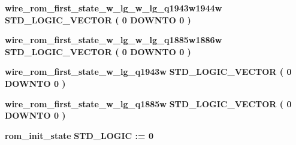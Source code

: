 \begin{DoxyCompactItemize}
\item 
{\bf wire\+\_\+rom\+\_\+first\+\_\+state\+\_\+w\+\_\+lg\+\_\+w\+\_\+lg\+\_\+q1943w1944w} {\bfseries \textcolor{comment}{S\+T\+D\+\_\+\+L\+O\+G\+I\+C\+\_\+\+V\+E\+C\+T\+OR}\textcolor{vhdlchar}{ }\textcolor{vhdlchar}{(}\textcolor{vhdlchar}{ }\textcolor{vhdlchar}{ } \textcolor{vhdldigit}{0} \textcolor{vhdlchar}{ }\textcolor{keywordflow}{D\+O\+W\+N\+TO}\textcolor{vhdlchar}{ }\textcolor{vhdlchar}{ } \textcolor{vhdldigit}{0} \textcolor{vhdlchar}{ }\textcolor{vhdlchar}{)}\textcolor{vhdlchar}{ }} 
\item 
{\bf wire\+\_\+rom\+\_\+first\+\_\+state\+\_\+w\+\_\+lg\+\_\+w\+\_\+lg\+\_\+q1885w1886w} {\bfseries \textcolor{comment}{S\+T\+D\+\_\+\+L\+O\+G\+I\+C\+\_\+\+V\+E\+C\+T\+OR}\textcolor{vhdlchar}{ }\textcolor{vhdlchar}{(}\textcolor{vhdlchar}{ }\textcolor{vhdlchar}{ } \textcolor{vhdldigit}{0} \textcolor{vhdlchar}{ }\textcolor{keywordflow}{D\+O\+W\+N\+TO}\textcolor{vhdlchar}{ }\textcolor{vhdlchar}{ } \textcolor{vhdldigit}{0} \textcolor{vhdlchar}{ }\textcolor{vhdlchar}{)}\textcolor{vhdlchar}{ }} 
\item 
{\bf wire\+\_\+rom\+\_\+first\+\_\+state\+\_\+w\+\_\+lg\+\_\+q1943w} {\bfseries \textcolor{comment}{S\+T\+D\+\_\+\+L\+O\+G\+I\+C\+\_\+\+V\+E\+C\+T\+OR}\textcolor{vhdlchar}{ }\textcolor{vhdlchar}{(}\textcolor{vhdlchar}{ }\textcolor{vhdlchar}{ } \textcolor{vhdldigit}{0} \textcolor{vhdlchar}{ }\textcolor{keywordflow}{D\+O\+W\+N\+TO}\textcolor{vhdlchar}{ }\textcolor{vhdlchar}{ } \textcolor{vhdldigit}{0} \textcolor{vhdlchar}{ }\textcolor{vhdlchar}{)}\textcolor{vhdlchar}{ }} 
\item 
{\bf wire\+\_\+rom\+\_\+first\+\_\+state\+\_\+w\+\_\+lg\+\_\+q1885w} {\bfseries \textcolor{comment}{S\+T\+D\+\_\+\+L\+O\+G\+I\+C\+\_\+\+V\+E\+C\+T\+OR}\textcolor{vhdlchar}{ }\textcolor{vhdlchar}{(}\textcolor{vhdlchar}{ }\textcolor{vhdlchar}{ } \textcolor{vhdldigit}{0} \textcolor{vhdlchar}{ }\textcolor{keywordflow}{D\+O\+W\+N\+TO}\textcolor{vhdlchar}{ }\textcolor{vhdlchar}{ } \textcolor{vhdldigit}{0} \textcolor{vhdlchar}{ }\textcolor{vhdlchar}{)}\textcolor{vhdlchar}{ }} 
\item 
{\bf rom\+\_\+init\+\_\+state} {\bfseries \textcolor{comment}{S\+T\+D\+\_\+\+L\+O\+G\+IC}\textcolor{vhdlchar}{ }\textcolor{vhdlchar}{ }\textcolor{vhdlchar}{\+:}\textcolor{vhdlchar}{=}\textcolor{vhdlchar}{ }\textcolor{vhdlchar}{ }\textcolor{vhdlchar}{\textquotesingle{}}\textcolor{vhdlchar}{ } \textcolor{vhdldigit}{0} \textcolor{vhdlchar}{ }\textcolor{vhdlchar}{\textquotesingle{}}\textcolor{vhdlchar}{ }} 
\item 

\end{DoxyCompactItemize}
